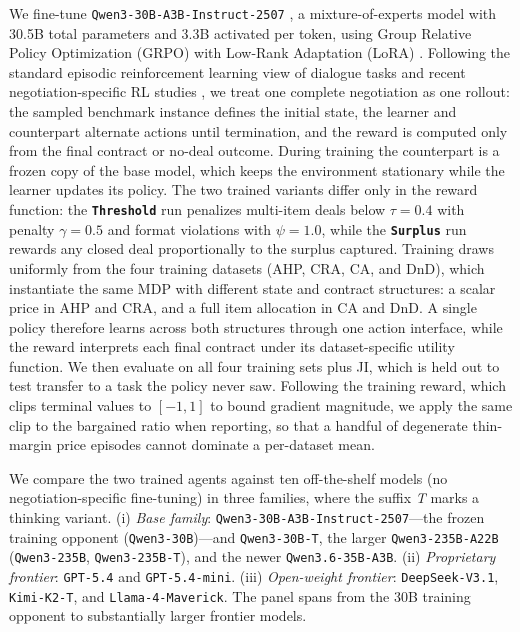 \documentclass{interact}
\theoremstyle{plain}
\theoremstyle{definition}
\theoremstyle{remark}
\newcommand{\model}[1]{\texttt{#1}}
\newcommand{\Threshold}{\textbf{\texttt{Threshold}}\xspace}
\newcommand{\Surplus}{\textbf{\texttt{Surplus}}\xspace}
\begin{document}
We fine-tune \model{Qwen3-30B-A3B-Instruct-2507} \cite{qwen2025qwen3}, a mixture-of-experts model with 30.5B total parameters and 3.3B activated per token, using Group Relative Policy Optimization (GRPO) \cite{shao2024deepseekmath} with Low-Rank Adaptation (LoRA) \cite{hu2022lora}. Following the standard episodic reinforcement learning view of dialogue tasks \cite{sutton2018reinforcement} and recent negotiation-specific RL studies \cite{liu2026instructing,bergemann2026bilateral}, we treat one complete negotiation as one rollout: the sampled benchmark instance defines the initial state, the learner and counterpart alternate actions until termination, and the reward is computed only from the final contract or no-deal outcome. During training the counterpart is a frozen copy of the base model, which keeps the environment stationary while the learner updates its policy. The two trained variants differ only in the reward function: the \Threshold run penalizes multi-item deals below $\tau{=}0.4$ with penalty $\gamma{=}0.5$ and format violations with $\psi{=}1.0$, while the \Surplus run rewards any closed deal proportionally to the surplus captured.
Training draws uniformly from the four training datasets (AHP, CRA, CA, and DnD), which instantiate the same MDP with different state and contract structures: a scalar price in AHP and CRA, and a full item allocation in CA and DnD. A single policy therefore learns across both structures through one action interface, while the reward interprets each final contract under its dataset-specific utility function. We then evaluate on all four training sets plus JI, which is held out to test transfer to a task the policy never saw. Following the training reward, which clips terminal values to $[-1,1]$ to bound gradient magnitude, we apply the same clip to the bargained ratio when reporting, so that a handful of degenerate thin-margin price episodes cannot dominate a per-dataset mean.

We compare the two trained agents against ten off-the-shelf models (no negotiation-specific fine-tuning) in three families, where the suffix \emph{T} marks a thinking variant. (i) \emph{Base family}: \model{Qwen3-30B-A3B-Instruct-2507}---the frozen training opponent (\model{Qwen3-30B})---and \model{Qwen3-30B-T}, the larger \model{Qwen3-235B-A22B} (\model{Qwen3-235B}, \model{Qwen3-235B-T}), and the newer \model{Qwen3.6-35B-A3B}. (ii) \emph{Proprietary frontier}: \model{GPT-5.4} and \model{GPT-5.4-mini}. (iii) \emph{Open-weight frontier}: \model{DeepSeek-V3.1}, \model{Kimi-K2-T}, and \model{Llama-4-Maverick}. The panel spans from the 30B training opponent to substantially larger frontier models.
\end{document}

